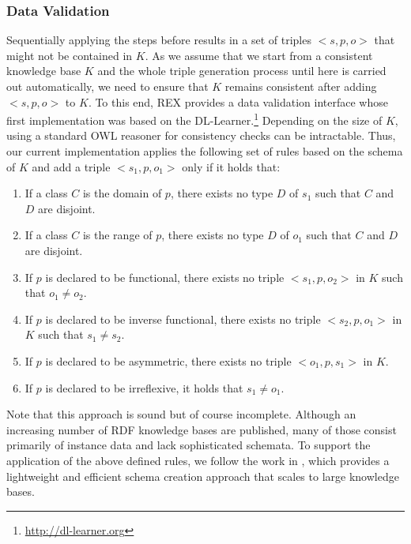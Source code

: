 \documentclass{llncs}
\begin{document}
\subsubsection{Data Validation}\label{axioms}
Sequentially applying the steps before results in a set of triples $<s,p,o>$ that might not be contained in $K$. 
As we assume that we start from a consistent knowledge base $K$ and the whole triple generation process until here is carried out automatically, we need to ensure that $K$ remains consistent after adding $<s,p,o>$ to $K$.
To this end, REX provides a data validation interface whose first implementation was based on the DL-Learner.\footnote{\url{http://dl-learner.org}}
Depending on the size of $K$, using a standard OWL reasoner for consistency checks can be intractable.
Thus, our current implementation applies the following set of rules based on the schema of $K$ and add a triple $<s_1,p,o_1>$ only if it holds that:
\begin{enumerate}
\item If a class $C$ is the domain of $p$, there exists no type $D$ of $s_1$ such that $C$ and $D$ are disjoint.
\item If a class $C$ is the range of $p$, there exists no type $D$ of $o_1$ such that $C$ and $D$ are disjoint.
\item If $p$ is declared to be functional, there exists no triple $<s_1,p,o_2>$ in $K$ such that $o_1 \neq o_2$.
\item If $p$ is declared to be inverse functional, there exists no triple $<s_2,p,o_1>$ in $K$ such that $s_1 \neq s_2$.
\item If $p$ is declared to be asymmetric, there exists no triple $<o_1,p,s_1>$ in $K$.
\item If $p$ is declared to be irreflexive, it holds that $s_1 \neq o_1$.
\end{enumerate}
Note that this approach is sound but of course incomplete.
Although an increasing number of RDF knowledge bases are published, many of those consist primarily of instance data and lack sophisticated schemata. 
To support the application of the above defined rules, we follow the work in \cite{Buehmann2012,pattern_enrichment}, which provides a lightweight and efficient schema creation approach that scales to large knowledge bases. 

\end{document}
